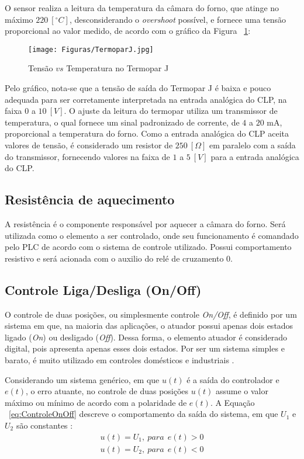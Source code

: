         O sensor realiza a leitura da temperatura da câmara do forno, que atinge no máximo $220 \ [^{\circ}C]$, desconsiderando o \textit{overshoot} possível, e fornece uma tensão proporcional ao valor medido, de acordo com o gráfico da Figura ~\ref{fig:GraficoTermopar}:
        \begin{figure}[H]
            \centering
                \texttt{[image: Figuras/TermoparJ.jpg]}
                \caption{Tensão $vs$ Temperatura no Termopar J} \label{fig:GraficoTermopar}
        \end{figure}
        
        Pelo gráfico, nota-se que a tensão de saída do Termopar J é baixa e pouco adequada para ser corretamente interpretada  na entrada analógica do CLP, na faixa $0$ a $10 \ [V]$. O ajuste da leitura do termopar utiliza um transmissor de temperatura, o qual fornece um sinal padronizado de corrente, de $4$ a $20$ mA, proporcional a temperatura do forno. Como a entrada analógica do CLP aceita valores de tensão, é considerado um resistor de $250 \ [\Omega]$ em paralelo com a saída do transmissor, fornecendo valores na faixa de $1$ a $5 \ [V]$ para a entrada analógica do CLP.

\subsection{Resistência de aquecimento}

A resistência é o componente responsável por aquecer a câmara do forno. Será utilizada como o elemento a ser controlado, onde seu funcionamento é comandado pelo PLC de acordo com o sistema de controle utilizado.
Possui comportamento resistivo e será acionada com o auxilio do relé de cruzamento 0.

    \subsection{Controle Liga/Desliga (On/Off)}
        O controle de duas posições, ou simplesmente controle \textit{On/Off}, é definido por um sistema em que, na maioria das aplicações, o atuador possui apenas dois estados ligado (\textit{On}) ou desligado (\textit{Off}). Dessa forma, o elemento atuador é considerado digital, pois apresenta apenas esses dois estados. Por ser um sistema simples e barato, é muito utilizado em controles domésticos e industriais \cite{Fundamentos_SistemasControle}.
            
        Considerando um sistema genérico, em que $u(t)$ é a saída do controlador e $e(t)$, o erro atuante, no controle de duas posições $u(t)$ assume o valor máximo ou mínimo de acordo com a polaridade de $e(t)$. A Equação ~\ref{eq:ControleOnOff} descreve o comportamento da saída do sistema, em que $U_1$ e $U_2$ são constantes \cite{Livro_Ogata}:
        \begin{equation}
            \label{eq:ControleOnOff}
            \begin{gathered}
                u(t) = U_1, \ para \ \ e(t) > 0 \\
                u(t) = U_2, \ para \ \ e(t) < 0
            \end{gathered}
        \end{equation}
        
